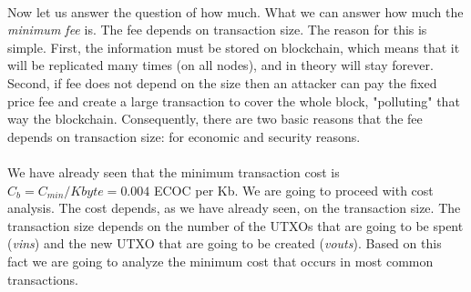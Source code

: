\documentclass{article}
\begin{document}
\paragraph{}
Now let us answer the question of how much. What we can answer how much the \emph{minimum fee} is. The fee depends on transaction size. The reason for this is simple. First, the information must be stored on blockchain, which means that it will be replicated many times (on all nodes), and in theory will stay forever. Second, if fee does not depend on the size then an attacker can pay the fixed price fee and create a large transaction to cover the whole block, "polluting" that way the blockchain. Consequently, there are two basic reasons that the fee depends on transaction size: for economic and security reasons.
\paragraph{}
We have already seen that the minimum transaction cost is $C_{b}=C_{min}/Kbyte=0.004$ ECOC per Kb. We are going to proceed with cost analysis. The cost depends, as we have already seen, on the transaction size.  The transaction size depends on the number of the UTXOs that are going to be spent (\emph{vins}) and the new UTXO  that are going to be created (\emph{vouts}). Based on this fact we are going to analyze the minimum cost that occurs in most common transactions.
\end{document}
